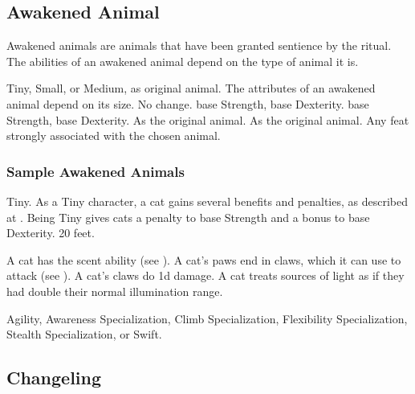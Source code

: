     \subsection{Awakened Animal}

        Awakened animals are animals that have been granted sentience by the  ritual.
        The abilities of an awakened animal depend on the type of animal it is.

         Tiny, Small, or Medium, as original animal.
         The attributes of an awakened animal depend on its size.
         No change.
          base Strength,  base Dexterity.
          base Strength,  base Dexterity.
         As the original animal.
         As the original animal.
         Any feat strongly associated with the chosen animal.

        \subsubsection{Sample Awakened Animals}


             Tiny. As a Tiny character, a cat gains several benefits and penalties, as described at .
             Being Tiny gives cats a  penalty to base Strength and a  bonus to base Dexterity.
             20 feet.
            \begin{itemize}
                 A cat has the scent ability (see ).
                 A cat's paws end in claws, which it can use to attack (see ). A cat's claws do \minus1d damage.
                 A cat treats sources of light as if they had double their normal illumination range.
            \end{itemize}
         Agility, Awareness Specialization, Climb Specialization, Flexibility Specialization, Stealth Specialization, or Swift.

    \subsection{Changeling}

